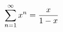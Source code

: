 \documentclass[preview]{standalone}
\begin{document}
\begin{align*}
\special{dvisvgm:raw <g id='unique000'>}\displaystyle\sum_{n=1}^{\infty}x^n=\dfrac{x}{1-x}\special{dvisvgm:raw </g>}
\end{align*}
\end{document}
